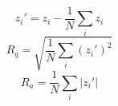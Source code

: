 \[
z_i' = z_i - \frac{1}{N}\sum_i z_i
\]
\[
R_q = \sqrt{\frac{1}{N}\sum_i (z_i')^2}
\]
\[
R_a = \frac{1}{N}\sum_i |z_i'|
\]

